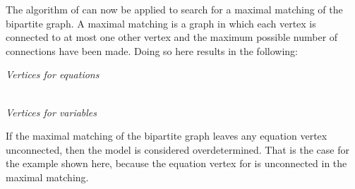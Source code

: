 The algorithm of \cite{hopcroft:1973} can now be applied to search
for a maximal matching of the bipartite graph.  A maximal matching
is a graph in which each vertex is connected to at most one other
vertex and the maximum possible number of connections have been
made.  Doing so here results in the following:
\begin{center}
\emph{Vertices for equations}\\[10pt]
  \\[5pt]
\emph{Vertices for variables}
\end{center}

If the maximal matching of the bipartite graph leaves any equation
vertex unconnected, then the model is considered overdetermined.
That is the case for the example shown here, because the equation
vertex for  is unconnected in the maximal matching.


